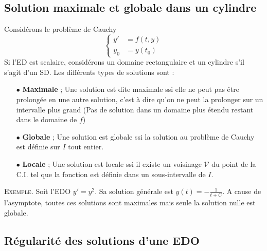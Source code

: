 	\subsection{Solution maximale et globale dans un cylindre}
	Considérons le problème de Cauchy
	\begin{equation}
	\left\{\begin{array}{ll}
	y' &= f(t,y)\\
	y_0 &= y(t_0)
	\end{array}\right.
	\end{equation}
	Si l'ED est scalaire, considérons un domaine rectangulaire et un cylindre s'il 
	s'agit d'un SD. Les différents types de solutions sont :
	\begin{enumerate}
	\item[$\bullet$] \textbf{Maximale} ; Une solution est dite maximale ssi elle ne 
	peut pas être prolongée en une autre solution, c'est à dire qu'on ne peut la 
	prolonger sur un intervalle plus grand (Pas de solution dans un domaine plus 
	étendu restant dans le domaine de $f$)
	\item[$\bullet$] \textbf{Globale} ; Une solution est globale ssi la solution 
	au problème de Cauchy est définie sur $I$ tout entier. 
	\item[$\bullet$] \textbf{Locale} ; Une solution est locale ssi il existe un 
	voisinage $\mathcal{V}$ du point de la C.I. tel que la fonction est définie 
	dans un sous-intervalle de $I$.
	\end{enumerate}

	\textsc{Exemple}. Soit l'EDO $y'=y^2$. Sa solution générale est $y(t) = 
	-\frac{1}{t+C}$. A cause de l'asymptote, toutes ces solutions sont maximales 
	mais seule la solution nulle est globale.
	
	\newpage
	\subsection{Régularité des solutions d'une EDO}
	\ \\
	
